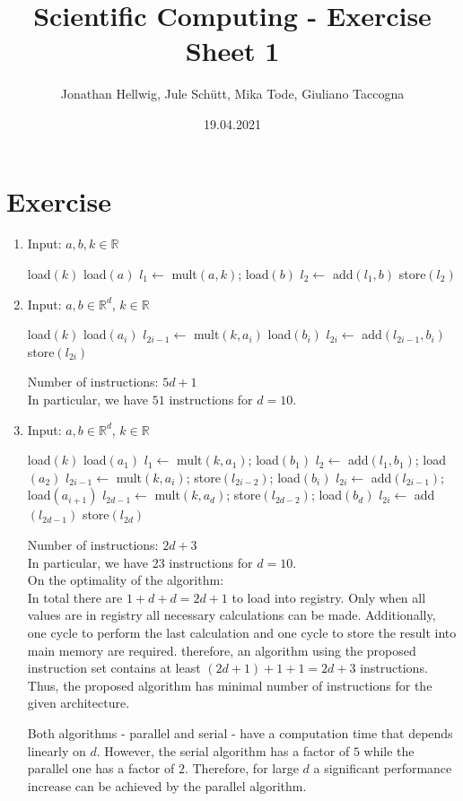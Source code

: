 \documentclass{article}
\title{Scientific Computing - Exercise Sheet 1}
\author{Jonathan Hellwig, Jule Schütt, Mika Tode, Giuliano Taccogna}
\date{19.04.2021}
\begin{document}
\maketitle

\section{Exercise}
\begin{enumerate}[label=(\alph*)]
  \item Input: $ a,b,k \in \mathbb{R}$
    \begin{algorithmic}[1]
  \State load$(k)$
  \State load$(a)$
  \State $l_1 \gets $ mult$(a,k)$; load$(b)$
  \State $l_2 \gets $ add$(l_1, b)$
  \State store$(l_2)$
\end{algorithmic}
  \item Input: $ a,b \in \mathbb{R}^d$, $k \in \mathbb{R}$
    \begin{algorithmic}[1]
      \State load$(k)$
        \State load$(a_i)$
        \State $l_{2i-1} \gets $ mult$(k, a_i)$
        \State load$(b_i)$
        \State $l_{2i} \gets $ add$(l_{2i-1}, b_i)$
        \State store$(l_{2i})$
      \EndFor
    \end{algorithmic}
  Number of instructions: $5d+1$ \\
  In particular, we have $51$ instructions for $d = 10$.
  \item Input: $ a,b \in \mathbb{R}^d$, $k \in \mathbb{R}$
    \begin{algorithmic}[1]
      \State load$(k)$
      \State load$(a_1)$
      \State $l_1 \gets $ mult$(k,a_1)$; load$(b_1)$
      \State $l_2 \gets $ add$(l_1, b_1)$; load$(a_2)$
      \State $l_{2i-1} \gets $ mult$(k,a_i)$; store$(l_{2i-2})$; load$(b_i)$
      \State $l_{2i} \gets $ add$(l_{2i-1})$; load$(a_{i+1})$
      \EndFor
      \State $l_{2d-1} \gets $ mult$(k,a_d)$; store$(l_{2d-2})$; load$(b_d)$
      \State $l_{2i} \gets $ add$(l_{2d-1})$
      \State store$(l_{2d})$
    \end{algorithmic}
    Number of instructions: $2d+3$ \\
    In particular, we have 23 instructions for $d = 10$. \\
    On the optimality of the algorithm: \\
    In total there are $1+d+d = 2d +1 $ to load into registry. Only when all values are in registry all necessary calculations can be made. Additionally, one cycle to perform the last calculation and one cycle to store the result into main memory are required. therefore, an algorithm using the proposed instruction set contains at least $(2d+1) + 1 + 1 = 2d + 3$ instructions. Thus, the proposed algorithm has minimal number of instructions for the given architecture. 

    Both algorithms - parallel and serial - have a computation time that depends linearly on $d$. However, the serial algorithm has a factor of $5$ while the parallel one has a factor of $2$. Therefore, for large $d$ a significant performance increase can be achieved by the parallel algorithm.
\end{enumerate}



\end{document}
